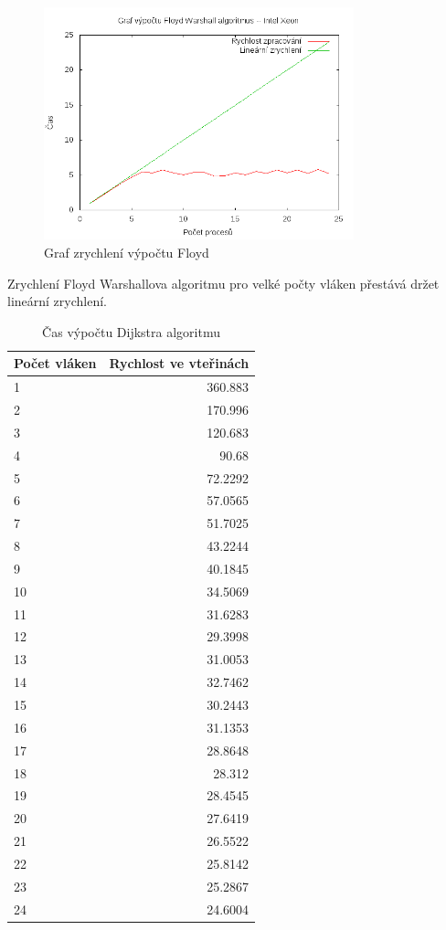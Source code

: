 \documentclass[a4paper,10pt]{article}
\begin{document}
\begin{figure}[H]
  \centering
    \includegraphics[width=0.8\textwidth]{graf_floyd_intel.png}
  \caption{Graf zrychlení výpočtu Floyd}
  \label{fig:floyd}
\end{figure}

Zrychlení Floyd Warshallova algoritmu pro velké počty vláken přestává držet lineární zrychlení.


\begin{table}[H]
  \centering
	\caption{Čas výpočtu Dijkstra algoritmu}
	\begin{tabular}{| l | r |}
\hline
Počet vláken & Rychlost ve vteřinách \\ \hline
1 & 360.883 \\ \hline
2 & 170.996 \\ \hline
3 & 120.683 \\ \hline
4 & 90.68 \\ \hline
5 & 72.2292 \\ \hline
6 & 57.0565 \\ \hline
7 & 51.7025 \\ \hline
8 & 43.2244 \\ \hline
9 & 40.1845 \\ \hline
10 & 34.5069 \\ \hline
11 & 31.6283 \\ \hline
12 & 29.3998 \\ \hline
13 & 31.0053 \\ \hline
14 & 32.7462 \\ \hline
15 & 30.2443 \\ \hline
16 & 31.1353 \\ \hline
17 & 28.8648 \\ \hline
18 & 28.312 \\ \hline
19 & 28.4545 \\ \hline
20 & 27.6419 \\ \hline
21 & 26.5522 \\ \hline
22 & 25.8142 \\ \hline
23 & 25.2867 \\ \hline
24 & 24.6004 \\ \hline
	\end{tabular}
  \label{tab:djfl}
\end{table}
\end{document}

